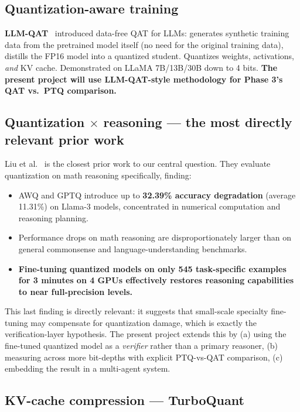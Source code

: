 \documentclass[11pt]{article}
\begin{document}
\subsection{Quantization-aware training}

\textbf{LLM-QAT}~\cite{liu2023llmqat} introduced data-free QAT for LLMs: generates synthetic training data from the pretrained model itself (no need for the original training data), distills the FP16 model into a quantized student. Quantizes weights, activations, \emph{and} KV cache. Demonstrated on LLaMA 7B/13B/30B down to 4 bits. \textbf{The present project will use LLM-QAT-style methodology for Phase 3's QAT vs.\ PTQ comparison.}

\subsection{Quantization $\times$ reasoning --- the most directly relevant prior work}

Liu et al.~\cite{liu2025quantmeetsreasoning} is the closest prior work to our central question. They evaluate quantization on math reasoning specifically, finding:

\begin{itemize}
  \item AWQ and GPTQ introduce up to \textbf{32.39\% accuracy degradation} (average 11.31\%) on Llama-3 models, concentrated in numerical computation and reasoning planning.
  \item Performance drops on math reasoning are disproportionately larger than on general commonsense and language-understanding benchmarks.
  \item \textbf{Fine-tuning quantized models on only 545 task-specific examples for 3 minutes on 4 GPUs effectively restores reasoning capabilities to near full-precision levels.}
\end{itemize}

This last finding is directly relevant: it suggests that small-scale specialty fine-tuning may compensate for quantization damage, which is exactly the verification-layer hypothesis. The present project extends this by (a) using the fine-tuned quantized model as a \emph{verifier} rather than a primary reasoner, (b) measuring across more bit-depths with explicit PTQ-vs-QAT comparison, (c) embedding the result in a multi-agent system.

\subsection{KV-cache compression --- TurboQuant}
\end{document}
